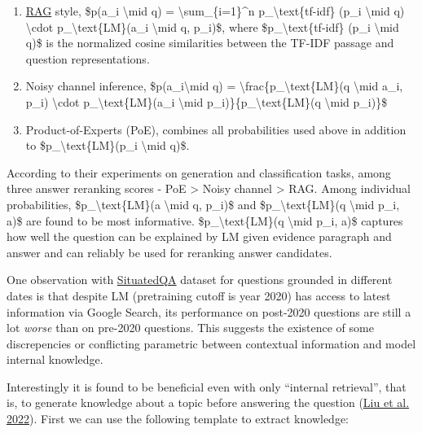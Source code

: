 \begin{enumerate}
\tightlist
\item
  \href{https://lilianweng.github.io/posts/2020-10-29-odqa/\#RAG}{RAG} style, \$p(a\_i \textbackslash mid q) = \textbackslash sum\_\{i=1\}\^{}n p\_\textbackslash text\{tf-idf\} (p\_i \textbackslash mid q) \textbackslash cdot p\_\textbackslash text\{LM\}(a\_i \textbackslash mid q, p\_i)\$, where \$p\_\textbackslash text\{tf-idf\} (p\_i \textbackslash mid q)\$ is the normalized cosine similarities between the TF-IDF passage and question representations.
\item
  Noisy channel inference, \$p(a\_i\textbackslash mid q) = \textbackslash frac\{p\_\textbackslash text\{LM\}(q \textbackslash mid a\_i, p\_i) \textbackslash cdot p\_\textbackslash text\{LM\}(a\_i \textbackslash mid p\_i)\}\{p\_\textbackslash text\{LM\}(q \textbackslash mid p\_i)\}\$
\item
  Product-of-Experts (PoE), combines all probabilities used above in addition to \$p\_\textbackslash text\{LM\}(p\_i \textbackslash mid q)\$.
\end{enumerate}

According to their experiments on generation and classification tasks, among three answer reranking scores - PoE \textgreater{} Noisy channel \textgreater{} RAG. Among individual probabilities, \$p\_\textbackslash text\{LM\}(a \textbackslash mid q, p\_i)\$ and \$p\_\textbackslash text\{LM\}(q \textbackslash mid p\_i, a)\$ are found to be most informative. \$p\_\textbackslash text\{LM\}(q \textbackslash mid p\_i, a)\$ captures how well the question can be explained by LM given evidence paragraph and answer and can reliably be used for reranking answer candidates.

One observation with \href{https://situatedqa.github.io/}{SituatedQA} dataset for questions grounded in different dates is that despite LM (pretraining cutoff is year 2020) has access to latest information via Google Search, its performance on post-2020 questions are still a lot \emph{worse} than on pre-2020 questions. This suggests the existence of some discrepencies or conflicting parametric between contextual information and model internal knowledge.

Interestingly it is found to be beneficial even with only ``internal retrieval'', that is, to generate knowledge about a topic before answering the question (\href{https://arxiv.org/abs/2110.08387}{Liu et al. 2022}). First we can use the following template to extract knowledge:

